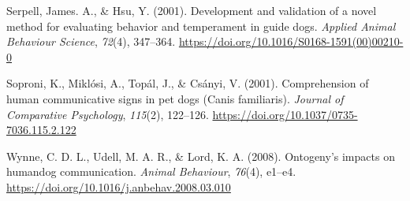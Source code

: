 \documentclass[
  man,floatsintext]{apa6}
\newlength{\cslhangindent}
\newlength{\cslentryspacingunit} %
\newenvironment{CSLReferences}[2] %
 {%
  \setlength{\parindent}{0pt}
  \ifodd #1
  \let\oldpar\par
  \def\par{\hangindent=\cslhangindent\oldpar}
  \fi
  \setlength{\parskip}{#2\cslentryspacingunit}
 }%
 {}
\begin{document}
\begin{CSLReferences}{1}{0}
\leavevmode{}%
Serpell, James. A., \& Hsu, Y. (2001). Development and validation of a novel method for evaluating behavior and temperament in guide dogs. \emph{Applied Animal Behaviour Science}, \emph{72}(4), 347--364. \url{https://doi.org/10.1016/S0168-1591(00)00210-0}

\leavevmode{}%
Soproni, K., Miklósi, A., Topál, J., \& Csányi, V. (2001). Comprehension of human communicative signs in pet dogs ({Canis} familiaris). \emph{Journal of Comparative Psychology}, \emph{115}(2), 122--126. \url{https://doi.org/10.1037/0735-7036.115.2.122}

\leavevmode{}%
Wynne, C. D. L., Udell, M. A. R., \& Lord, K. A. (2008). Ontogeny's impacts on human{\textendash}dog communication. \emph{Animal Behaviour}, \emph{76}(4), e1--e4. \url{https://doi.org/10.1016/j.anbehav.2008.03.010}

\end{CSLReferences}
\end{document}
